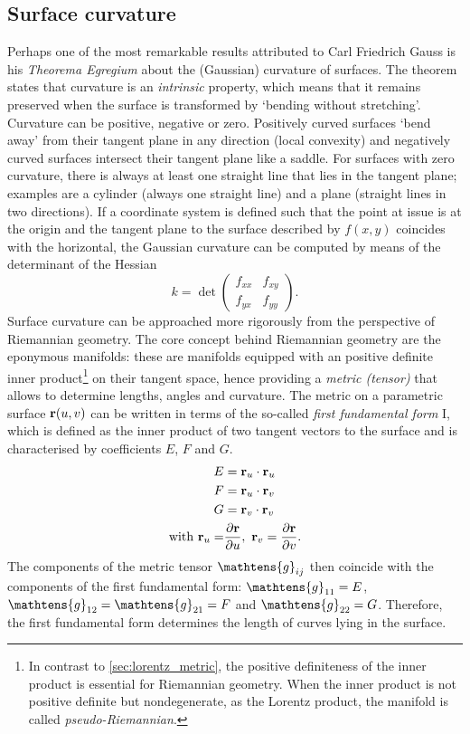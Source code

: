 \subsection{Surface curvature}
Perhaps one of the most remarkable results attributed to Carl Friedrich Gauss is his \emph{Theorema Egregium} about the (Gaussian) curvature of surfaces. The theorem states that curvature is an \emph{intrinsic} property, which means that it remains preserved when the surface is transformed by `bending without stretching'. Curvature can be positive, negative or zero. Positively curved surfaces `bend away' from their tangent plane in any direction (local convexity) and negatively curved surfaces intersect their tangent plane like a saddle. For surfaces with zero curvature, there is always at least one straight line that lies in the tangent plane; examples are a cylinder (always one straight line) and a plane (straight lines in two directions). If a coordinate system is defined such that the point at issue is at the origin and the tangent plane to the surface described by \(f(x, y)\) coincides with the horizontal, the Gaussian curvature can be computed by means of the determinant of the Hessian \cite{Thurston1997, ONeill2006}
    \[ 
        k = \det \begin{pmatrix}
                f_{xx} & f_{xy}\\
                f_{yx} & f_{yy}
        \end{pmatrix}.
    \]
    Surface curvature can be approached more rigorously from the perspective of Riemannian geometry. The core concept behind Riemannian geometry are the eponymous manifolds: these are manifolds equipped with an positive definite inner product\footnote{In contrast to \cref{sec:lorentz_metric}, the positive definiteness of the inner product is essential for Riemannian geometry. When the inner product is not positive definite but nondegenerate, as the Lorentz product, the manifold is called \emph{pseudo-Riemannian}.} on their tangent space, hence providing a \emph{metric (tensor)} that allows to determine lengths, angles and curvature. The metric on a parametric surface \(\vb{r}(u, v)\) can be written in terms of the so-called \emph{first fundamental form} I, which is defined as the inner product of two tangent vectors to the surface  and is characterised by coefficients \(E\), \(F\) and \(G\).
\begin{equation}
    \begin{split}
        E &= \vb{r}_u \cdot \vb{r}_u \\
        F &= \vb{r}_u \cdot \vb{r}_v \\
        G &= \vb{r}_v \cdot \vb{r}_v \\
        \text{with }  \vb{r}_u = & \pdv{\vb{r}}{u},\ \vb{r}_v = \pdv{\vb{r}}{v}.
    \end{split}
    \label{eq:first_fform}
\end{equation}
The components of the metric tensor \(\mathtens{g}_{ij}\) then coincide with the components of the first fundamental form: \(\mathtens{g}_{11} = E\), \(\mathtens{g}_{12} = \mathtens{g}_{21}= F\) and \(\mathtens{g}_{22} = G\). Therefore, the first fundamental form determines the length of curves lying in the surface.

